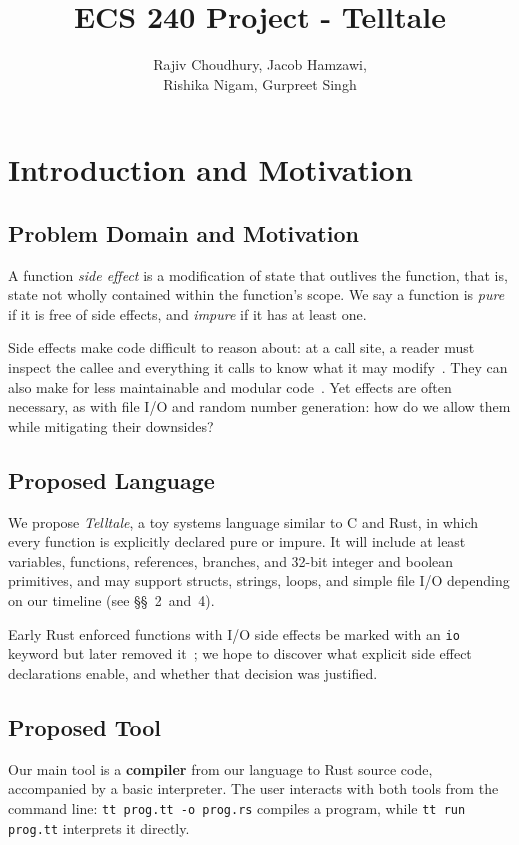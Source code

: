 \documentclass[12pt, letterpaper]{article}
\title{ECS 240 Project - Telltale}
\author{Rajiv Choudhury, Jacob Hamzawi,\\ Rishika Nigam, Gurpreet Singh}
\begin{document}
\maketitle


\section{Introduction and Motivation}

\subsection{Problem Domain and Motivation}
A function \emph{side effect} is a modification of state that outlives the function,
that is, state not wholly contained within the function's scope.
We say a function is \emph{pure} if it is free of side effects, and \emph{impure} if it has at least one.

Side effects make code difficult to reason about: at a call site, a reader must inspect
the callee and everything it calls to know what it may modify~\cite{cousot_purity_2005}.
They can also make for less maintainable and modular code~\cite{hughes_why_1989,backus_can_1978}.
Yet effects are often necessary, as with file I/O and random number generation: how do we allow them while mitigating their downsides?

\subsection{Proposed Language}

We propose \emph{Telltale}, a toy systems language similar to C and Rust, in which every function is explicitly declared pure or impure.
It will include at least variables, functions, references, branches, and 32-bit integer and boolean primitives, and may support structs, strings, loops, and simple file I/O depending on our timeline (see \S\S~2~and~4).

Early Rust enforced functions with I/O side effects be marked with an \texttt{io} keyword but later removed it~\cite{hoare2013pure}; we hope to discover what explicit side effect declarations enable, and whether that decision was justified.


\subsection{Proposed Tool}
Our main tool is a \textbf{compiler} from our language to Rust source code, accompanied by a basic interpreter.
The user interacts with both tools from the command line:
\texttt{tt prog.tt -o prog.rs} compiles a program, while
\texttt{tt run prog.tt} interprets it directly.
\end{document}
